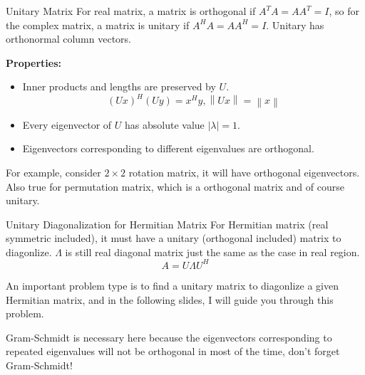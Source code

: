 \documentclass{beamer}
\begin{document}
\begin{frame}{Unitary Matrix}
For real matrix, a matrix is orthogonal if $A^TA=AA^T=I$, so for the complex matrix, a matrix is unitary if $A^HA=AA^H=I$. Unitary has orthonormal column vectors.

\vspace{5pt}
\textbf{Properties:}
\begin{itemize}
    \item Inner products and lengths are preserved by $U$.
    \begin{equation*}
        \left( Ux \right) ^H\left( Uy \right) =x^Hy, \left\| Ux \right\| =\left\| x \right\|
    \end{equation*}
    \item Every eigenvector of $U$ has absolute value $|\lambda| = 1$.
    \item Eigenvectors corresponding to different eigenvalues are orthogonal.
\end{itemize}

\vspace{3pt}
For example, consider $2\times 2$ rotation matrix, it will have orthogonal eigenvectors. Also true for permutation matrix, which is a orthogonal matrix and of course unitary.

\end{frame}

\begin{frame}{Unitary Diagonalization for Hermitian Matrix}
For Hermitian matrix (real symmetric included), it must have a unitary (orthogonal included) matrix to diagonlize. $\Lambda$ is still real diagonal matrix just the same as the case in real region.
\begin{equation*}
    A=U\Lambda U^H
\end{equation*}

An important problem type is to find a unitary matrix to diagonlize a given Hermitian matrix, and in the following slides, I will guide you through this problem.

\vspace{3pt}
Gram-Schmidt is necessary here because the eigenvectors corresponding to repeated eigenvalues will not be orthogonal in most of the time, don't forget Gram-Schmidt!

\end{frame}
\end{document}
